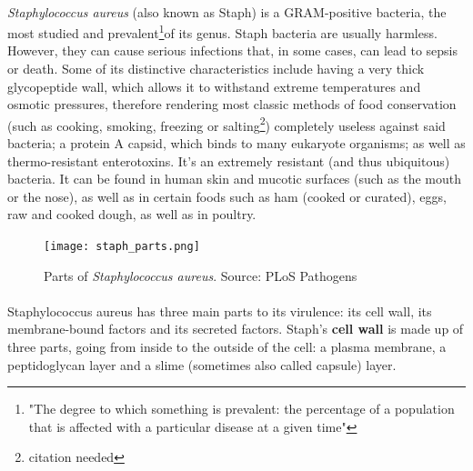 \paragraph{}\emph{Staphylococcus aureus} (also known as Staph) is a GRAM-positive bacteria, the most studied and prevalent\footnote{"The degree to which something is prevalent: the percentage of a population that is affected with a particular disease at a given time"\cite{DefinitionPREVALENCE1970}}of its genus. Staph bacteria are usually harmless. However, they can cause serious infections that, in some cases, can lead to sepsis or death. Some of its distinctive characteristics include having a very thick glycopeptide wall, which allows it to withstand extreme temperatures and osmotic pressures, therefore rendering most classic methods of food conservation (such as cooking, smoking, freezing or salting\footnote{citation needed}) completely useless against said bacteria; a protein A capsid, which binds to many eukaryote organisms; as well as thermo-resistant enterotoxins. It's an extremely resistant (and thus ubiquitous) bacteria. It can be found in human skin and mucotic surfaces (such as the mouth or the nose), as well as in certain foods such as ham (cooked or curated), eggs, raw and cooked dough, as well as in poultry.\newpage
\begin{figure}\begin{center}\texttt{[image: staph\_parts.png]}\end{center}\caption{Parts of \emph{Staphylococcus aureus}. Source: PLoS Pathogens}\end{figure}\paragraph{}Staphylococcus aureus has three main parts to its virulence: its cell wall, its membrane-bound factors and its secreted factors. Staph's \textbf{cell wall} is made up of three parts, going from inside to the outside of the cell: a plasma membrane, a peptidoglycan layer and a slime (sometimes also called capsule) layer. %
